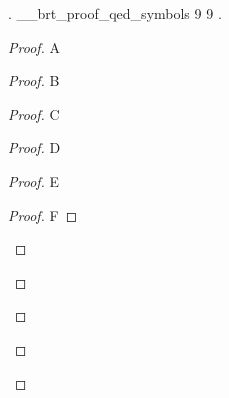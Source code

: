 \documentclass{article}
\begin{document}
    .
    \ExplSyntaxOn
    \seqItemTF \g__brt_proof_qed_symbols {9} {}
        { {9}}
    \ExplSyntaxOff
    .

    \begin{proof}
        A
        \begin{proof}
            B
            \begin{proof}
                C
                \begin{proof}
                    D
                    \begin{proof}
                        E
                        \begin{proof}
                            F
                        \end{proof}
                    \end{proof}
                \end{proof}
            \end{proof}
        \end{proof}
    \end{proof}
\end{document}
